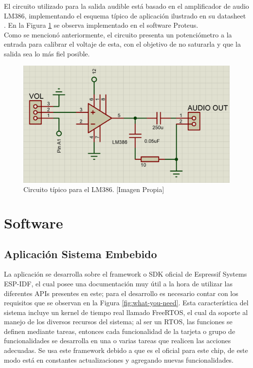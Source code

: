 		El circuito utilizado para la salida audible está basado en el amplificador de audio LM386, implementando el esquema típico de aplicación ilustrado en su datasheet \cite{LM386}. En la Figura \ref{fig:AUD} se observa implementado en el software Proteus.\\
		
		Como se mencionó anteriormente, el circuito presenta un potenciómetro a la entrada para calibrar el voltaje de esta, con el objetivo de no saturarla y que la salida sea lo más fiel posible.\\
		
		\begin{figure}[H]
			\centering
			\caption[Circuito típico para el LM386.]{Circuito típico para el LM386.  [Imagen Propia]}
			\label{fig:AUD}
			\includegraphics[width=0.7\linewidth]{Imagenes/AUD}
		\end{figure}		
				
\section{Software}

\subsection{Aplicación Sistema Embebido}
La aplicación se desarrolla sobre el framework o SDK oficial de Espressif Systems ESP-IDF, el cual posee una documentación \cite{ES} muy útil a la hora de utilizar las diferentes APIs presentes en este; para el desarrollo es necesario contar con los requisitos que se observan en la Figura \ref{fig:what-you-need}. Esta característica del sistema incluye un kernel de tiempo real llamado FreeRTOS, el cual da soporte al manejo de los diversos recursos del sistema; al ser un RTOS, las funciones se definen mediante tareas, entonces cada funcionalidad de la tarjeta o grupo de funcionalidades se desarrolla en una o varias tareas que realicen las acciones adecuadas. Se usa este framework debido a que es el oficial para este chip, de este modo está en constantes actualizaciones y agregando nuevas funcionalidades.\\

